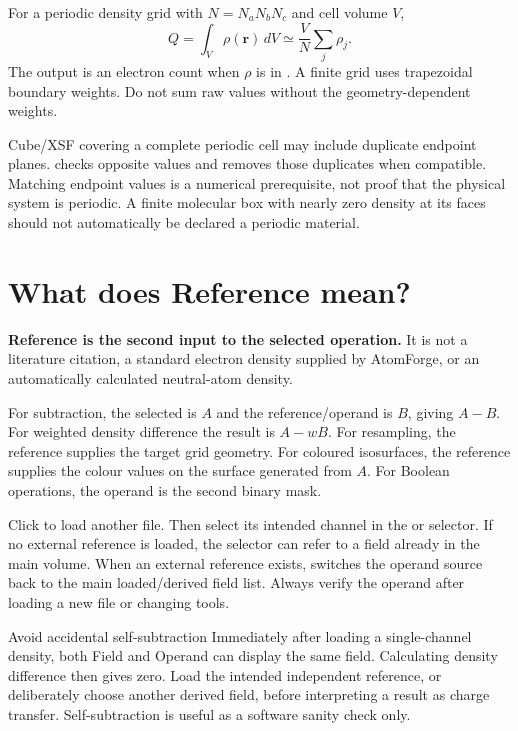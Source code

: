 For a periodic density grid with $N=N_aN_bN_c$ and cell volume $V$,
\[
Q=\int_V\rho(\mathbf r)\,dV\simeq\frac{V}{N}\sum_j\rho_j.
\]
The output is an electron count when $\rho$ is in \densityunit. A finite grid uses trapezoidal boundary weights. Do not sum raw values without the geometry-dependent weights.

Cube/XSF covering a complete periodic cell may include duplicate endpoint planes.  checks opposite values and removes those duplicates when compatible. Matching endpoint values is a numerical prerequisite, not proof that the physical system is periodic. A finite molecular box with nearly zero density at its faces should not automatically be declared a periodic material.

\section{What does Reference mean?}
\textbf{Reference is the second input to the selected operation.} It is not a literature citation, a standard electron density supplied by AtomForge, or an automatically calculated neutral-atom density.

For subtraction, the selected  is $A$ and the reference/operand is $B$, giving $A-B$. For weighted density difference the result is $A-wB$. For resampling, the reference supplies the target grid geometry. For coloured isosurfaces, the reference supplies the colour values on the surface generated from $A$. For Boolean operations, the operand is the second binary mask.

Click  to load another file. Then select its intended channel in the  or  selector. If no external reference is loaded, the selector can refer to a field already in the main volume. When an external reference exists,  switches the operand source back to the main loaded/derived field list. Always verify the operand after loading a new file or changing tools.

\begin{guidance}{Avoid accidental self-subtraction}
Immediately after loading a single-channel density, both Field and Operand can display the same field. Calculating density difference then gives zero. Load the intended independent reference, or deliberately choose another derived field, before interpreting a result as charge transfer. Self-subtraction is useful as a software sanity check only.
\end{guidance}

